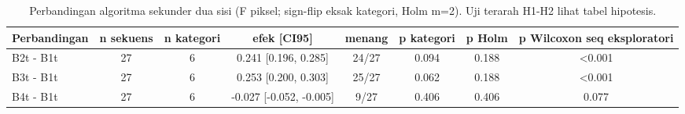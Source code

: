 \begin{table}[t]
\centering
\caption{Perbandingan algoritma sekunder dua sisi (F piksel; sign-flip eksak kategori, Holm m=2). Uji terarah H1-H2 lihat tabel hipotesis.}
\label{tab:stats_primary}
\begin{tabular}{lccccccc}
\toprule
Perbandingan & n sekuens & n kategori & efek [CI95] & menang & p kategori & p Holm & p Wilcoxon seq eksploratori \\
\midrule
B2t - B1t & 27 & 6 & 0.241 [0.196, 0.285] & 24/27 & 0.094 & 0.188 & <0.001 \\
B3t - B1t & 27 & 6 & 0.253 [0.200, 0.303] & 25/27 & 0.062 & 0.188 & <0.001 \\
B4t - B1t & 27 & 6 & -0.027 [-0.052, -0.005] & 9/27 & 0.406 & 0.406 & 0.077 \\
\bottomrule
\end{tabular}
\end{table}
